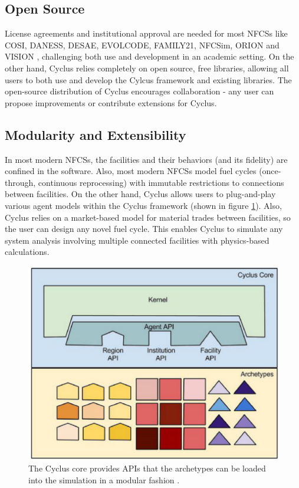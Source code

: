 \subsection{Open Source}
License agreements and institutional
approval are needed for most \glspl{NFCS} like COSI, DANESS, DESAE, EVOLCODE,
FAMILY21, NFCSim, ORION and VISION \cite{jacobson_verifiable_2010}, challenging
both use and development in an academic setting.
On the other hand, Cyclus relies completely on open source,
free libraries, allowing all users to both use and develop the
Cylcus framework and existing libraries. The open-source distribution
of Cyclus encourages collaboration - any user can propose
improvements or contribute extensions for Cyclus.

\subsection{Modularity and Extensibility}
In most modern \glspl{NFCS}, the facilities and their
behaviors (and its fidelity) are confined in the software.
Also, most modern \glspl{NFCS} model
fuel cycles (once-through, continuous reprocessing)
with immutable restrictions to connections between facilities. On the
other hand, Cyclus allows users to plug-and-play various agent models
within the Cyclus framework (shown in figure \ref{fig:core}).
Also, Cyclus relies on a market-based model
for material trades between facilities, so the user can design
any novel fuel cycle. This enables Cyclus to simulate any system analysis
involving multiple connected facilities with physics-based
calculations.


\begin{figure}[htbp!]
	\begin{center}
		\includegraphics[scale=0.3]{./images/cyclus_core.png}
	\end{center}
	\caption{The Cyclus core provides APIs that the archetypes
			can be loaded into the simulation in a modular fashion
			\cite{huff_fundamental_2016}.}
	\label{fig:core}
\end{figure}

